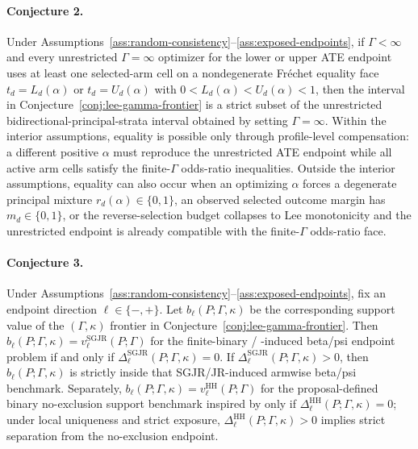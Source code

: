 \documentclass[11pt]{article}
\theoremstyle{definition}
\theoremstyle{plain}
\theoremstyle{remark}
\begin{document}
\paragraph{Conjecture 2.}
\label{conj:strict-tightening}
Under Assumptions~\ref{ass:random-consistency}--\ref{ass:exposed-endpoints}, if \(\Gamma<\infty\) and every unrestricted \(\Gamma=\infty\) optimizer for the lower or upper ATE endpoint uses at least one selected-arm cell on a nondegenerate Fréchet equality face \(t_d=L_d(\alpha)\) or \(t_d=U_d(\alpha)\) with \(0<L_d(\alpha)<U_d(\alpha)<1\), then the interval in Conjecture~\ref{conj:lee-gamma-frontier} is a strict subset of the unrestricted bidirectional-principal-strata interval obtained by setting \(\Gamma=\infty\).  Within the interior assumptions, equality is possible only through profile-level compensation: a different positive \(\alpha\) must reproduce the unrestricted ATE endpoint while all active arm cells satisfy the finite-\(\Gamma\) odds-ratio inequalities.  Outside the interior assumptions, equality can also occur when an optimizing \(\alpha\) forces a degenerate principal mixture \(r_d(\alpha)\in\{0,1\}\), an observed selected outcome margin has \(m_d\in\{0,1\}\), or the reverse-selection budget collapses to Lee monotonicity and the unrestricted endpoint is already compatible with the finite-\(\Gamma\) odds-ratio face.

\paragraph{Conjecture 3.}
\label{conj:coupling-iff}
Under Assumptions~\ref{ass:random-consistency}--\ref{ass:exposed-endpoints}, fix an endpoint direction \(\ell\in\{-,+\}\).  Let \(b_\ell(P;\Gamma,\kappa)\) be the corresponding support value of the \((\Gamma,\kappa)\) frontier in Conjecture~\ref{conj:lee-gamma-frontier}.  Then \(b_\ell(P;\Gamma,\kappa)=v_\ell^{\mathrm{SGJR}}(P;\Gamma)\) for the finite-binary \citet{ShepherdGilbertJemiaiRotnitzky2006} / \citet{JemiaiRotnitzkyShepherdGilbert2007}-induced beta/psi endpoint problem if and only if \(\Delta_\ell^{\mathrm{SGJR}}(P;\Gamma,\kappa)=0\).  If \(\Delta_\ell^{\mathrm{SGJR}}(P;\Gamma,\kappa)>0\), then \(b_\ell(P;\Gamma,\kappa)\) is strictly inside that SGJR/JR-induced armwise beta/psi benchmark.  Separately, \(b_\ell(P;\Gamma,\kappa)=v_\ell^{\mathrm{HH}}(P;\Gamma)\) for the proposal-defined binary no-exclusion support benchmark inspired by \citet{HonoreHu2020Selection} only if \(\Delta_\ell^{\mathrm{HH}}(P;\Gamma,\kappa)=0\); under local uniqueness and strict exposure, \(\Delta_\ell^{\mathrm{HH}}(P;\Gamma,\kappa)>0\) implies strict separation from the no-exclusion endpoint.
\end{document}
